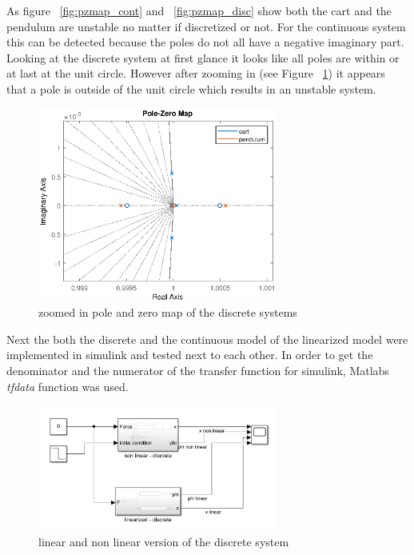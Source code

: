 As figure ~\ref{fig:pzmap_cont} and ~\ref{fig:pzmap_disc} show both the cart and the pendulum are unstable no matter if discretized or not. For the continuous system this can be detected because the poles do not all have a negative imaginary part. Looking at the discrete system at first glance it looks like all poles are within or at last at the unit circle. However after zooming in (see Figure ~\ref{fig:pzmap_disc_zoomed}) it appears that a pole is outside of the unit circle which results in an unstable system.
\begin{figure}[H]
		\centering
		\includegraphics[width=0.7\textwidth]{figures/pzmap_disc_zoomed.eps}
		\caption{zoomed in pole and zero map of the discrete systems}
		\label{fig:pzmap_disc_zoomed}
\end{figure}
Next the both the discrete and the continuous model of the linearized model were implemented in simulink and tested next to each other. In order to get the denominator and the numerator of the transfer function for simulink, Matlabs \textit{tfdata} function was used.
\begin{figure}[H]
		\centering
		\includegraphics[width=0.7\textwidth]{figures/bothdiscrete_subsystems.png}
		\caption{linear and non linear version of the discrete system}
		\label{fig:both_discrete_subsystems}
\end{figure}

